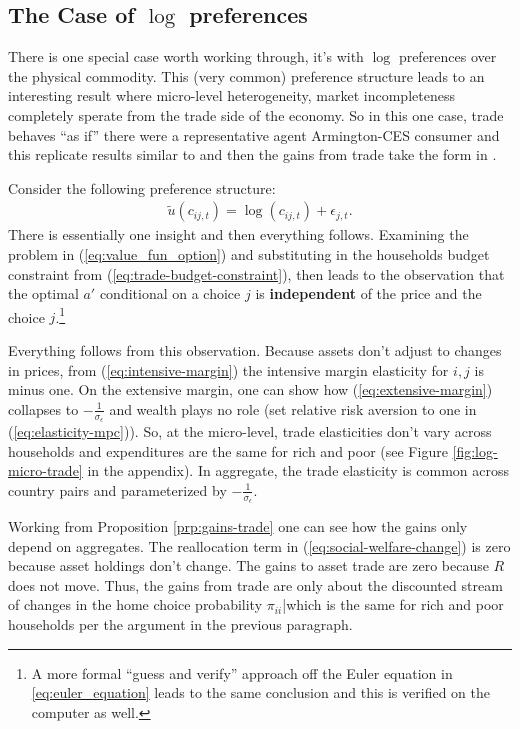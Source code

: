 \documentclass[12pt,pdftex]{article}
\begin{document}
\begin{onehalfspacing}
\subsection{The Case of $\log$ preferences}

There is one special case worth working through, it's with $\log$ preferences over the physical commodity. This (very common) preference structure leads to an interesting result where micro-level heterogeneity, market incompleteness completely sperate from the trade side of the economy. So in this one case, trade behaves ``as if'' there were a representative agent Armington-CES consumer and this replicate results similar to \citet*{anderson1987ces}  and then the gains from trade take the form in \citet{arkolakis2012new}.

Consider the following preference structure:
\begin{align}
\tilde{u}( c_{ij,t} ) =  \log(c_{ij,t}) + \epsilon_{j,t}. \nonumber
\end{align}
There is essentially one insight and then everything follows. Examining the problem in (\ref{eq:value_fun_option}) and substituting in the households budget constraint from (\ref{eq:trade-budget-constraint}), then leads to the observation that the optimal $a'$ conditional on a choice $j$ is \textbf{independent} of the price and the choice $j$.\footnote{A more formal ``guess and verify'' approach off the Euler equation in \ref{eq:euler_equation} leads to the same conclusion and this is verified on the computer as well.}

Everything follows from this observation. Because assets don't adjust to changes in prices, from (\ref{eq:intensive-margin}) the intensive margin elasticity for $i,j$ is minus one. On the extensive margin, one can show how (\ref{eq:extensive-margin}) collapses to $-\frac{1}{\sigma_{\epsilon}}$ and wealth plays no role (set relative risk aversion to one in (\ref{eq:elasticity-mpc})). So, at the micro-level, trade elasticities don't vary across households and expenditures are the same for rich and poor (see Figure \ref{fig:log-micro-trade} in the appendix). In aggregate, the trade elasticity is common across country pairs and parameterized by $-\frac{1}{\sigma_{\epsilon}}$.

Working from Proposition \ref{prp:gains-trade} one can see how the gains only depend on aggregates. The reallocation term in (\ref{eq:social-welfare-change}) is zero because asset holdings don't change. The gains to asset trade are zero because $R$ does not move. Thus, the gains from trade are only about the discounted stream of changes in the home choice probability $\pi_{ii}$|which is the same for rich and poor households per the argument in the previous paragraph.


\end{onehalfspacing}
\end{document}
